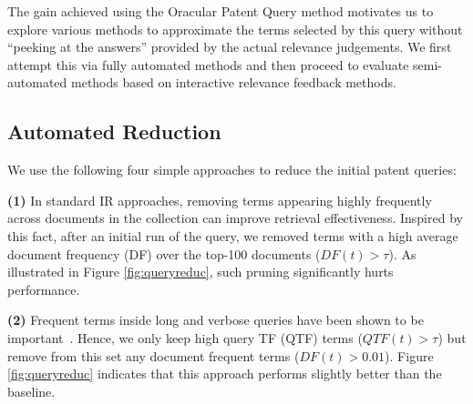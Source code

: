 The gain achieved using the Oracular Patent Query method motivates us to explore various methods to approximate the terms
selected by this query without ``peeking at the answers'' provided by
the actual relevance judgements.  We first attempt this via fully
automated methods and then proceed to evaluate semi-automated methods
based on interactive relevance feedback methods.

\subsection{Automated Reduction}
\label{sec:AutomatedReduction}
%
We use the following four simple approaches to reduce the initial patent queries: 

\vspace*{0.5mm}
\noindent \textbf{(1)} In standard IR approaches, removing terms appearing highly frequently across documents in the collection can improve retrieval effectiveness. Inspired by this fact, after an initial run of the query, we removed terms  with a high average document frequency (DF) over the top-100 documents ($\mathit{DF}(t)>\tau$). As illustrated in Figure \ref{fig:queryreduc}, such pruning significantly hurts performance.  

\vspace*{0.5mm}
\noindent \textbf{(2)} Frequent terms inside long and verbose queries have been shown to be important~\cite{maxwell2013compact}. Hence, we only keep high query TF (QTF) terms ($\mathit{QTF}(t)>\tau$) but remove from this set any document frequent terms ($\mathit{DF}(t)>0.01$).  Figure \ref{fig:queryreduc} indicates that this approach performs slightly better than the baseline.

